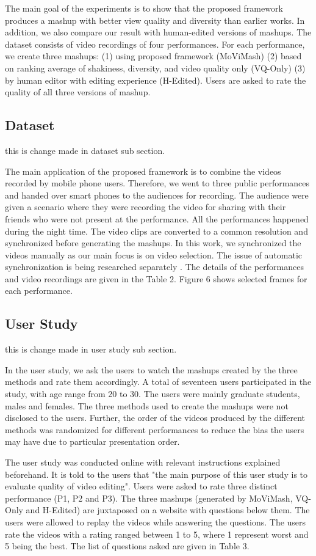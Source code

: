 \documentclass{new}
\begin{document}
The main goal of the experiments is to show that the proposed
framework produces a mashup with better view quality and diversity than earlier works. In addition, we also compare our result with
human-edited versions of mashups. The dataset consists of video
recordings of four performances. For each performance, we create three mashups: (1) using proposed framework (MoViMash) (2)
based on ranking average of shakiness, diversity, and video quality only (VQ-Only) (3) by human editor with editing experience (H-Edited). Users are asked to rate the quality of all three versions of
mashup.

\subsection{Dataset}
this is change made in dataset sub section.

The main application of the proposed framework is to combine
the videos recorded by mobile phone users. Therefore, we went to
three public performances and handed over smart phones to the audiences for recording. The audience were given a scenario where
they were recording the video for sharing with their friends who
were not present at the performance. All the performances happened during the night time. The video clips are converted to a
common resolution and synchronized before generating the mashups.
In this work, we synchronized the videos manually as our main focus is on video selection. The issue of automatic synchronization is
being researched separately \cite{14}. The details of the performances
and video recordings are given in the Table 2. Figure 6 shows selected frames for each performance.

\subsection{User Study}
this is change made in user study sub section.

In the user study, we ask the users to watch the mashups created
by the three methods and rate them accordingly. A total of seventeen users participated in the study, with age range from 20 to 30.
The users were mainly graduate students, males and females. The
three methods used to create the mashups were not disclosed to the
users. Further, the order of the videos produced by the different
methods was randomized for different performances to reduce the
bias the users may have due to particular presentation order.

The user study was conducted online with relevant instructions
explained beforehand. It is told to the users that "the main purpose
of this user study is to evaluate quality of video editing". Users
were asked to rate three distinct performance (P1, P2 and P3). The
three mashups (generated by MoViMash, VQ-Only and H-Edited)
are juxtaposed on a website with questions below them. The users were allowed to replay the videos while answering the questions.
The users rate the videos with a rating ranged between 1 to 5, where
1 represent worst and 5 being the best. The list of questions asked
are given in Table 3.
\end{document}
